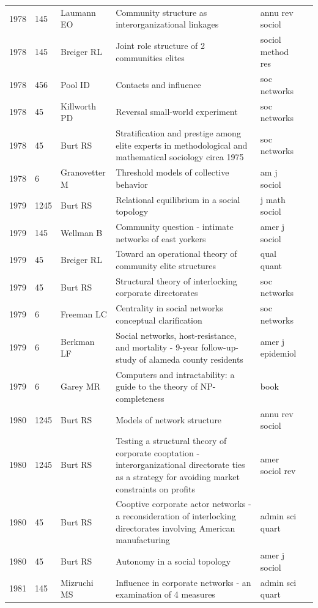 \documentclass[11pt]{article} %
\begin{document}
\begin{landscape}
\begin{longtable}{p{0.7cm}|p{0.8cm}|p{3cm}|p{14.5cm}|p{3.5cm}l}
1978& 	145& 	 Laumann EO& 	 Community structure as interorganizational linkages& 	 annu rev sociol\\
1978& 	145& 	 Breiger RL& 	 Joint role structure of 2 communities elites& 	 sociol method res\\
1978& 	456& 	 Pool ID& 	 Contacts and influence& 	 soc networks\\
1978& 	45& 	 Killworth PD& 	 Reversal small-world experiment& 	 soc networks\\
1978& 	45& 	 Burt RS& 	 Stratification and prestige among elite experts in methodological and mathematical sociology circa 1975& 	 soc networks\\
1978& 	6& 	 Granovetter M& 	 Threshold models of collective behavior& 	 am j sociol\\
1979& 	1245& 	 Burt RS& 	 Relational equilibrium in a social topology& 	 j math sociol\\
1979& 	145& 	 Wellman B& 	 Community question - intimate networks of east yorkers& 	 amer j sociol\\
1979& 	45& 	 Breiger RL& 	 Toward an operational theory of community elite structures& 	 qual quant\\
1979& 	45& 	 Burt RS& 	 Structural theory of interlocking corporate directorates& 	 soc networks\\
1979& 	6& 	 Freeman LC& 	 Centrality in social networks conceptual clarification& 	 soc networks\\
1979& 	6& 	 Berkman LF& 	 Social networks, host-resistance, and mortality - 9-year follow-up-study of alameda county residents& 	 amer j epidemiol\\
1979& 	6& 	 Garey MR& 	 Computers and intractability: a guide to the theory of NP-completeness& 	 book\\
1980& 	1245& 	 Burt RS& 	 Models of network structure& 	 annu rev sociol\\
1980& 	1245& 	 Burt RS& 	 Testing a structural theory of corporate cooptation - interorganizational directorate ties as a strategy for avoiding market constraints on profits& 	 amer sociol rev\\
1980& 	45& 	 Burt RS& 	 Cooptive corporate actor networks - a reconsideration of interlocking directorates involving American manufacturing& 	 admin sci quart\\
1980& 	45& 	 Burt RS& 	 Autonomy in a social topology& 	 amer j sociol\\
1981& 	145& 	 Mizruchi MS& 	 Influence in corporate networks - an examination of 4 measures& 	 admin sci quart\\

\end{longtable}
\end{landscape}
\end{document}
